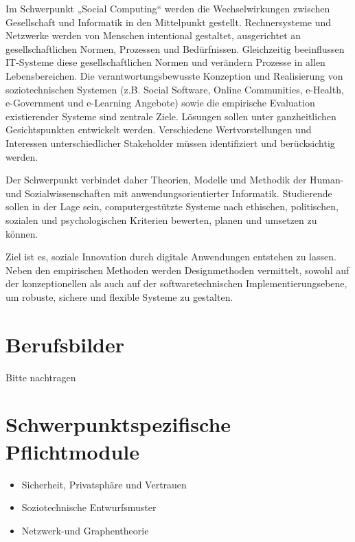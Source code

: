 Im Schwerpunkt „Social Computing`` werden die Wechselwirkungen zwischen
Gesellschaft und Informatik in den Mittelpunkt gestellt. Rechnersysteme
und Netzwerke werden von Menschen intentional gestaltet, ausgerichtet an
gesellschaftlichen Normen, Prozessen und Bedürfnissen. Gleichzeitig
beeinflussen IT-Systeme diese gesellschaftlichen Normen und verändern
Prozesse in allen Lebensbereichen. Die verantwortungsbewusste Konzeption
und Realisierung von soziotechnischen Systemen (z.B. Social Software,
Online Communities, e-Health, e-Government und e-Learning Angebote)
sowie die empirische Evaluation existierender Systeme sind zentrale
Ziele. Lösungen sollen unter ganzheitlichen Gesichtspunkten entwickelt
werden. Verschiedene Wertvorstellungen und Interessen unterschiedlicher
Stakeholder müssen identifiziert und berücksichtig werden.

Der Schwerpunkt verbindet daher Theorien, Modelle und Methodik der
Human- und Sozialwissenschaften mit anwendungsorientierter Informatik.
Studierende sollen in der Lage sein, computergestützte Systeme nach
ethischen, politischen, sozialen und psychologischen Kriterien bewerten,
planen und umsetzen zu können.

Ziel ist es, soziale Innovation durch digitale Anwendungen entstehen zu
lassen. Neben den empirischen Methoden werden Designmethoden vermittelt,
sowohl auf der konzeptionellen als auch auf der softwaretechnischen
Implementierungsebene, um robuste, sichere und flexible Systeme zu
gestalten.

\section*{Berufsbilder\label{/mi-2017/modulbeschreibungen-master/schwerpunkt-soziotechnische-systeme}}\label{berufsbilderpathlabelmi-2017modulbeschreibungen-masterschwerpunkt-soziotechnische-systeme}

Bitte nachtragen

\section*{Schwerpunktspezifische
Pflichtmodule\label{/mi-2017/modulbeschreibungen-master/schwerpunkt-soziotechnische-systeme}}\label{schwerpunktspezifische-pflichtmodulepathlabelmi-2017modulbeschreibungen-masterschwerpunkt-soziotechnische-systeme}

\begin{itemize}
\tightlist
\item
  Sicherheit, Privatsphäre und Vertrauen
\item
  Soziotechnische Entwurfsmuster
\item
  Netzwerk-und Graphentheorie
\end{itemize}


